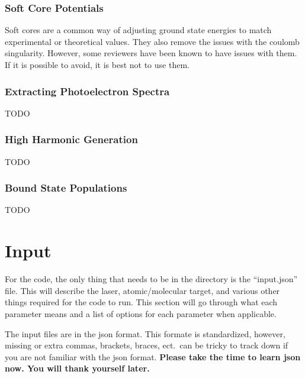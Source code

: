 \documentclass{article}
\begin{document}
\subsubsection{Soft Core Potentials} %
\label{ssub:soft_core_potentials}
Soft cores are a common way of adjusting ground state energies to match experimental or theoretical values. They also remove the issues with the coulomb singularity. However, some reviewers have been known to have issues with them. If it is possible to avoid, it is best not to use them.

\subsubsection{Extracting Photoelectron Spectra} %
\label{ssub:extracting_photoelectron_spectra}
TODO

\subsubsection{High Harmonic Generation} %
\label{ssub:high_harmonic_generation}
TODO

\subsubsection{Bound State Populations} %
\label{ssub:bound_state_populations}
TODO


\section{Input} %
\label{sec:input}

For the code, the only thing that needs to be in the directory is the ``input.json'' file. This will describe the laser, atomic/molecular target, and various other things required for the code to run. This section will go through what each parameter means and a list of options for each parameter when applicable.

The input files are in the json format. This formate is standardized, however, missing or extra commas, brackets, braces, ect.\ can be tricky to track down if you are not familiar with the json format. \textbf{Please take the time to learn json now. You will thank yourself later.}
\end{document}

